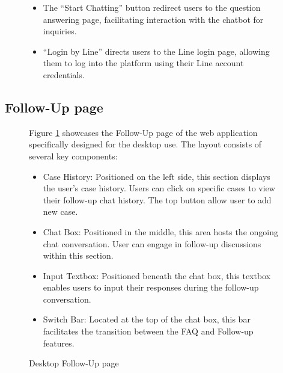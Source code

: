 \documentclass[12pt,oneside,openright,a4paper]{cpe-english-project}
\begin{document}
\begin{figure}[!h]
\begin{justify}
        \begin{itemize}
          \item The “Start Chatting” button redirect users to the question answering page, facilitating interaction with the chatbot for inquiries.
          \item “Login by Line” directs users to the Line login page, allowing them to log into the platform using their Line account credentials.
        \end{itemize}
      \end{justify}
    \end{figure}
    \newpage

    \subsection{Follow-Up page}
      \begin{figure}[!h]
        \centering
        \caption{Desktop Follow-Up page}\label{fig:Desk_Follow}
        \begin{justify}
          \qquad Figure \ref{fig:Desk_Follow} showcases the Follow-Up page of the web application specifically designed for the desktop use. The layout consists of several key components: \par
          \begin{itemize}
            \item Case History: Positioned on the left side, this section displays the user’s case history. Users can click on specific cases to view their follow-up chat history. The top button allow user to add new case.
            \item Chat Box: Positioned in the middle, this area hosts the ongoing chat conversation. User can engage in follow-up discussions within this section. 
            \item Input Textbox: Positioned beneath the chat box, this textbox enables users to input their responses during the follow-up conversation. 
            \item Switch Bar: Located at the top of the chat box, this bar facilitates the transition between the FAQ and Follow-up features.
          \end{itemize}
        \end{justify}
      \end{figure}
\end{document}
